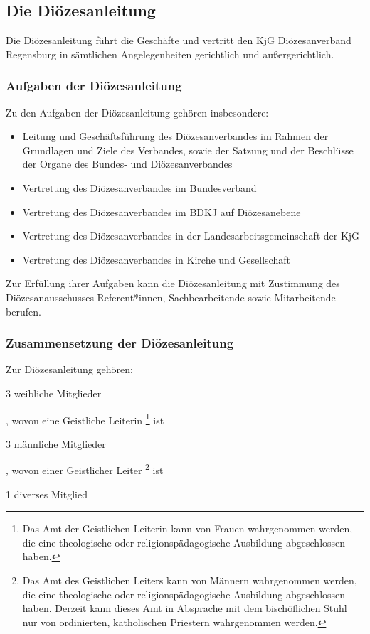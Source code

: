 \documentclass[12pt]{report}
\begin{document}
\begin{flushleft}
\subsection{Die Diözesanleitung}
Die Diözesanleitung führt die Geschäfte und vertritt den KjG Diözesanverband Regensburg in sämtlichen
Angelegenheiten gerichtlich und außergerichtlich.
\subsubsection{Aufgaben der Diözesanleitung}
Zu den Aufgaben der Diözesanleitung gehören insbesondere:
\begin{itemize}
  \item Leitung und Geschäftsführung des Diözesanverbandes im Rahmen der Grundlagen und Ziele
        des Verbandes, sowie der Satzung und der Beschlüsse der Organe des Bundes- und Diözesanverbandes
  \item Vertretung des Diözesanverbandes im Bundesverband
  \item Vertretung des Diözesanverbandes im BDKJ auf Diözesanebene
  \item Vertretung des Diözesanverbandes in der Landesarbeitsgemeinschaft der KjG
  \item Vertretung des Diözesanverbandes in Kirche und Gesellschaft
\end{itemize}

Zur Erfüllung ihrer Aufgaben kann die Diözesanleitung mit Zustimmung des Diözesanausschusses
Referent*innen, Sachbearbeitende sowie Mitarbeitende berufen.

\subsubsection{Zusammensetzung der Diözesanleitung}
Zur Diözesanleitung gehören:
\begin{itemize}
  {\color{red}\item 3 weibliche Mitglieder}, wovon eine Geistliche Leiterin 
       \footnote{
           Das Amt der Geistlichen Leiterin kann von Frauen wahrgenommen werden, die eine theologische
           oder religionspädagogische Ausbildung abgeschlossen haben.
       }
       ist
  {\color{red}\item 3 männliche Mitglieder}, wovon einer Geistlicher Leiter
        \footnote{
            Das Amt des Geistlichen Leiters kann von Männern wahrgenommen werden, die eine theologische
            oder religionspädagogische Ausbildung abgeschlossen haben. Derzeit kann dieses Amt in Absprache
            mit dem bischöflichen Stuhl nur von ordinierten, katholischen Priestern wahrgenommen werden.	
        }
        ist
    {\color{red}\item 1 diverses Mitglied}
\end{itemize}


\end{flushleft}
\end{document}
